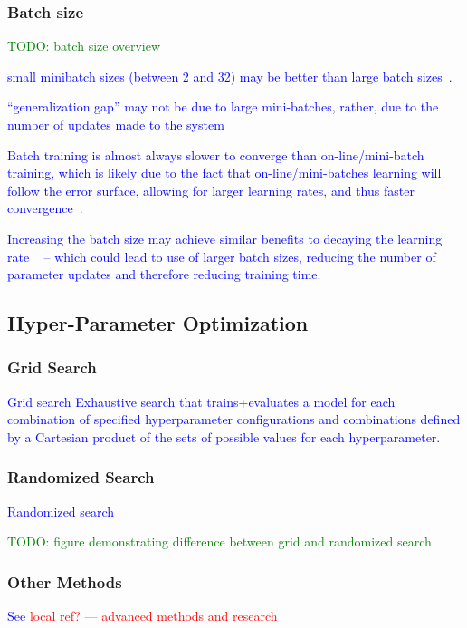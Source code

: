 \subsubsection{Batch size}

\textcolor{green}{TODO: batch size overview}

\textcolor{blue}{small minibatch sizes (between 2 and 32) may be better than large batch sizes~\cite{masters2018revisiting}.}

\textcolor{blue}{``generalization gap'' may not be due to large mini-batches, rather, due to the number of updates made to the system~\cite{hoffer2017train}}

\textcolor{blue}{Batch training is almost always slower to converge than on-line/mini-batch training, which is likely due to the fact that on-line/mini-batches learning will follow the error surface, allowing for larger learning rates, and thus faster convergence~\cite{wilson2003general}.}

\textcolor{blue}{Increasing the batch size may achieve similar benefits to decaying the learning rate ~\cite{smith2017don} -- which could lead to use of larger batch sizes, reducing the number of parameter updates and therefore reducing training time.}

\subsection{Hyper-Parameter Optimization}

\subsubsection{Grid Search}

\textcolor{blue}{{Grid search} Exhaustive search that trains+evaluates a model for each combination of specified hyperparameter configurations and combinations defined by a Cartesian product of the sets of possible values for each hyperparameter.}

\subsubsection{Randomized Search}

\textcolor{blue}{{Randomized search} }

\textcolor{green}{TODO: figure demonstrating difference between grid and randomized search}

\subsubsection{Other Methods}

\textcolor{blue}{See \textcolor{red}{local ref? --- advanced methods and research}}